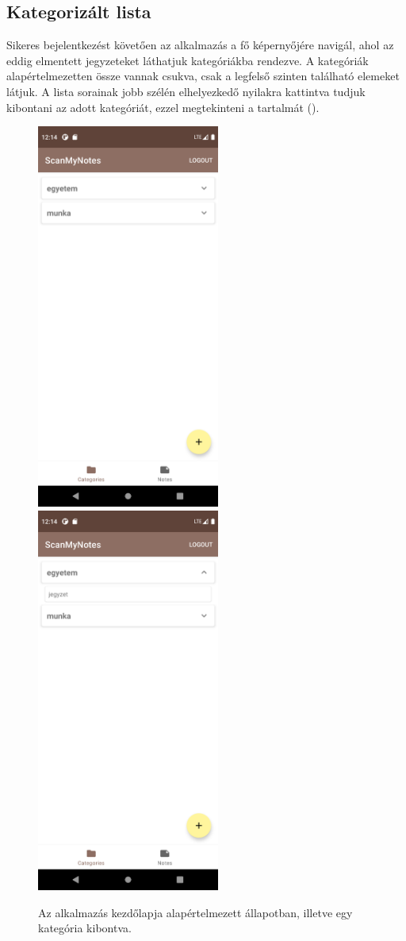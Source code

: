 \subsection{Kategorizált lista}
Sikeres bejelentkezést követően az alkalmazás a fő képernyőjére navigál, ahol az eddig elmentett jegyzeteket láthatjuk kategóriákba rendezve. A kategóriák alapértelmezetten össze vannak csukva, csak a legfelső szinten található elemeket látjuk. A lista sorainak jobb szélén elhelyezkedő nyilakra kattintva tudjuk kibontani az adott kategóriát, ezzel megtekinteni a tartalmát ().

\begin{figure}[!ht]
	\centering
	\includegraphics[width=60mm, keepaspectratio]{figures/notelist_closed.png}
	\includegraphics[width=60mm, keepaspectratio]{figures/notelist_open.png}
	\caption{Az alkalmazás kezdőlapja alapértelmezett állapotban, illetve egy kategória kibontva.}
	\label{fig:NoteListScreen}
\end{figure}


